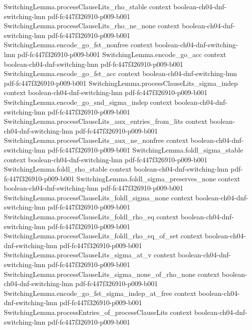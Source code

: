 \begin{theorem}
\proofstep
  {SwitchingLemma.processClauseLits_rho_stable}
  {context}
  {boolean-ch04-dnf-switching-lmn}
  {pdf-fc447f326910-p009-b001}
\proofstep
  {SwitchingLemma.processClauseLits_rho_ne_none}
  {context}
  {boolean-ch04-dnf-switching-lmn}
  {pdf-fc447f326910-p009-b001}
\proofstep
  {SwitchingLemma.encode_go_fst_nonfree}
  {context}
  {boolean-ch04-dnf-switching-lmn}
  {pdf-fc447f326910-p009-b001}
\proofstep
  {SwitchingLemma.encode_go_acc}
  {context}
  {boolean-ch04-dnf-switching-lmn}
  {pdf-fc447f326910-p009-b001}
\proofstep
  {SwitchingLemma.encode_go_fst_acc}
  {context}
  {boolean-ch04-dnf-switching-lmn}
  {pdf-fc447f326910-p009-b001}
\proofstep
  {SwitchingLemma.processClauseLits_sigma_indep}
  {context}
  {boolean-ch04-dnf-switching-lmn}
  {pdf-fc447f326910-p009-b001}
\proofstep
  {SwitchingLemma.encode_go_snd_sigma_indep}
  {context}
  {boolean-ch04-dnf-switching-lmn}
  {pdf-fc447f326910-p009-b001}
\proofstep
  {SwitchingLemma.processClauseLits_aux_entries_from_lits}
  {context}
  {boolean-ch04-dnf-switching-lmn}
  {pdf-fc447f326910-p009-b001}
\proofstep
  {SwitchingLemma.processClauseLits_aux_ne_nonfree}
  {context}
  {boolean-ch04-dnf-switching-lmn}
  {pdf-fc447f326910-p009-b001}
\proofstep
  {SwitchingLemma.foldl_sigma_stable}
  {context}
  {boolean-ch04-dnf-switching-lmn}
  {pdf-fc447f326910-p009-b001}
\proofstep
  {SwitchingLemma.foldl_rho_stable}
  {context}
  {boolean-ch04-dnf-switching-lmn}
  {pdf-fc447f326910-p009-b001}
\proofstep
  {SwitchingLemma.foldl_sigma_preserves_none}
  {context}
  {boolean-ch04-dnf-switching-lmn}
  {pdf-fc447f326910-p009-b001}
\proofstep
  {SwitchingLemma.processClauseLits_foldl_sigma_none}
  {context}
  {boolean-ch04-dnf-switching-lmn}
  {pdf-fc447f326910-p009-b001}
\proofstep
  {SwitchingLemma.processClauseLits_foldl_rho_eq}
  {context}
  {boolean-ch04-dnf-switching-lmn}
  {pdf-fc447f326910-p009-b001}
\proofstep
  {SwitchingLemma.processClauseLits_foldl_rho_eq_of_set}
  {context}
  {boolean-ch04-dnf-switching-lmn}
  {pdf-fc447f326910-p009-b001}
\proofstep
  {SwitchingLemma.processClauseLits_sigma_at_v}
  {context}
  {boolean-ch04-dnf-switching-lmn}
  {pdf-fc447f326910-p009-b001}
\proofstep
  {SwitchingLemma.processClauseLits_sigma_none_of_rho_none}
  {context}
  {boolean-ch04-dnf-switching-lmn}
  {pdf-fc447f326910-p009-b001}
\proofstep
  {SwitchingLemma.encode_go_fst_sigma_indep_at_free}
  {context}
  {boolean-ch04-dnf-switching-lmn}
  {pdf-fc447f326910-p009-b001}
\proofstep
  {SwitchingLemma.processEntries_of_processClauseLits}
  {context}
  {boolean-ch04-dnf-switching-lmn}
  {pdf-fc447f326910-p009-b001}

\end{theorem}
